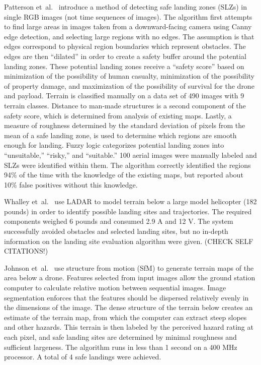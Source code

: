 Patterson et~al.~\cite{timely_landing_site_identification} introduce a method of detecting safe landing zones (SLZs) in single RGB images (not time sequences of images). The algorithm first attempts to find large areas in images taken from a downward-facing camera using Canny edge detection, and selecting large regions with no edges. The assumption is that edges correspond to physical region boundaries which represent obstacles. The edges are then ``dilated'' in order to create a safety buffer around the potential landing zones. These potential landing zones receive a ``safety score'' based on minimization of the possibility of human casualty, minimization of the possibility of property damage, and maximization of the possibility of survival for the drone and payload. Terrain is classified manually on a data set of 490 images with 9 terrain classes. Distance to man-made structures is a second component of the safety score, which is determined from analysis of existing maps. Lastly, a measure of roughness determined by the standard deviation of pixels from the mean of a safe landing zone, is used to determine which regions are smooth enough for landing. Fuzzy logic categorizes potential landing zones into ``unsuitable,'' ``risky,'' and ``suitable.'' 100 aerial images were manually labeled and SLZs were identified within them. The algorithm correctly identified the regions 94\% of the time with the knowledge of the existing maps, but reported about 10\% false positives without this knowledge.

Whalley et~al.~\cite{field_testing_helicopter} use LADAR to model terrain below a large model helicopter (182 pounds) in order to identify possible landing sites and trajectories. The required components weighed 6 pounds and consumed 2.9 A and 12 V. The system successfully avoided obstacles and selected landing sites, but no in-depth information on the landing site evaluation algorithm were given. (CHECK SELF CITATIONS!)

Johnson et~al.~\cite{helicopter_hazardous_terrain} use structure from motion (SfM) to generate terrain maps of the area below a drone. Features selected from input images allow the ground station computer to calculate relative motion between sequential images. Image segmentation enforces that the features should be dispersed relatively evenly in the dimensions of the image. The dense structure of the terrain below creates an estimate of the terrain map, from which the computer can extract steep slopes and other hazards. This terrain is then labeled by the perceived hazard rating at each pixel, and safe landing sites are determined by minimal roughness and sufficient largeness. The algorithm runs in less than 1 second on a 400 MHz processor. A total of 4 safe landings were achieved.

